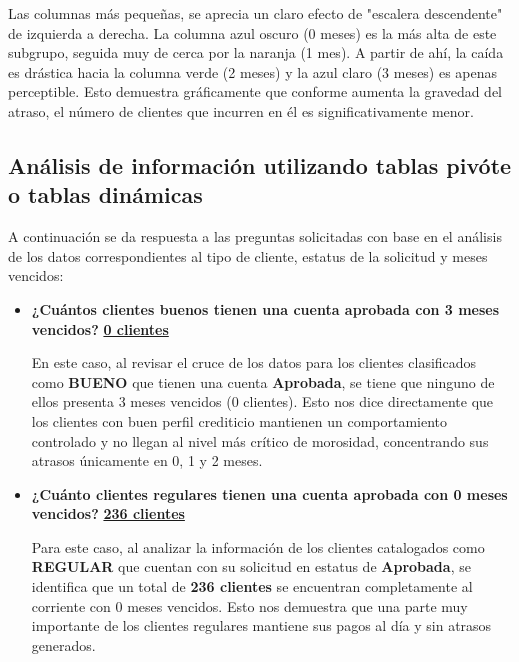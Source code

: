 \documentclass[letterpaper,11pt]{article}
\begin{document}
Las columnas más pequeñas, se aprecia un claro efecto de "escalera descendente" de izquierda a derecha. La columna azul oscuro (0 meses) es la más alta de este subgrupo, seguida muy de cerca por la naranja (1 mes). A partir de ahí, la caída es drástica hacia la columna verde (2 meses) y la azul claro (3 meses) es apenas perceptible. Esto demuestra gráficamente que conforme aumenta la gravedad del atraso, el número de clientes que incurren en él es significativamente menor.



\subsection{Análisis de información utilizando tablas pivóte o tablas dinámicas}

A continuación se da respuesta a las preguntas solicitadas con base en el análisis de los datos correspondientes al tipo de cliente, estatus de la solicitud y meses vencidos:

\begin{itemize}
    \item \textbf{¿Cuántos clientes buenos tienen una cuenta aprobada con 3 meses vencidos?} \underline{\hspace{0.5cm}\textbf{0 clientes}\hspace{0.5cm}}
    
    En este caso, al revisar el cruce de los datos para los clientes clasificados como \textbf{BUENO} que tienen una cuenta \textbf{Aprobada}, se tiene que ninguno de ellos presenta 3 meses vencidos (0 clientes). Esto nos dice directamente que los clientes con buen perfil crediticio mantienen un comportamiento controlado y no llegan al nivel más crítico de morosidad, concentrando sus atrasos únicamente en 0, 1 y 2 meses.
    
    \item \textbf{¿Cuánto clientes regulares tienen una cuenta aprobada con 0 meses vencidos?} \underline{\hspace{0.5cm}\textbf{236 clientes}\hspace{0.5cm}}
    
    Para este caso, al analizar la información de los clientes catalogados como \textbf{REGULAR} que cuentan con su solicitud en estatus de \textbf{Aprobada}, se identifica que un total de \textbf{236 clientes} se encuentran completamente al corriente con 0 meses vencidos. Esto nos demuestra que una parte muy importante de los clientes regulares mantiene sus pagos al día y sin atrasos generados.
\end{itemize}
\end{document}
